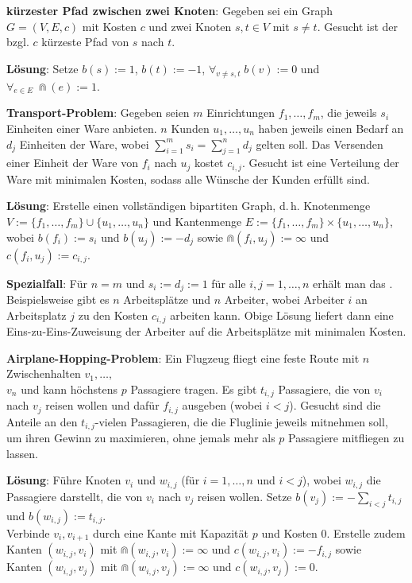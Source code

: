 \textbf{kürzester Pfad zwischen zwei Knoten}:
Gegeben sei ein Graph $G = (V, E, c)$ mit Kosten $c$ und
zwei Knoten $s, t \in V$ mit $s \not= t$.
Gesucht ist der bzgl. $c$ kürzeste Pfad von $s$ nach $t$.

\textbf{Lösung}:
Setze $b(s) := 1$, $b(t) := -1$, $\forall_{v \not= s, t}\; b(v) := 0$ und
$\forall_{e \in E}\; \Cap(e) := 1$.

\linie

\textbf{Transport-Problem}:
Gegeben seien $m$ Einrichtungen $f_1, \dotsc, f_m$, die jeweils $s_i$ Einheiten einer Ware
anbieten.
$n$ Kunden $u_1, \dotsc, u_n$ haben jeweils einen Bedarf an $d_j$ Einheiten der Ware,
wobei $\sum_{i=1}^m s_i = \sum_{j=1}^n d_j$ gelten soll.
Das Versenden einer Einheit der Ware von $f_i$ nach $u_j$ kostet $c_{i,j}$.
Gesucht ist eine Verteilung der Ware mit minimalen Kosten, sodass alle Wünsche der Kunden
erfüllt sind.

\textbf{Lösung}:
Erstelle einen vollständigen bipartiten Graph, d.\,h. Knotenmenge\\
$V := \{f_1, \dotsc, f_m\} \cup \{u_1, \dotsc, u_n\}$
und Kantenmenge $E := \{f_1, \dotsc, f_m\} \times \{u_1, \dotsc, u_n\}$,\\
wobei $b(f_i) := s_i$ und $b(u_j) := -d_j$ sowie
$\Cap(f_i, u_j) := \infty$ und $c(f_i, u_j) := c_{i,j}$.

\textbf{Spezialfall}:
Für $n = m$ und $s_i := d_j := 1$ für alle $i, j = 1, \dotsc, n$ erhält man das
.
Beispielsweise gibt es $n$ Arbeitsplätze und $n$ Arbeiter,
wobei Arbeiter $i$ an Arbeitsplatz $j$ zu den Kosten $c_{i,j}$ arbeiten kann.
Obige Lösung liefert dann eine Eins-zu-Eins-Zuweisung der Arbeiter auf die Arbeitsplätze
mit minimalen Kosten.

\linie

\textbf{Airplane-Hopping-Problem}:
Ein Flugzeug fliegt eine feste Route mit $n$ Zwischenhalten $v_1, \dotsc,$\\
$v_n$ und kann höchstens $p$ Passagiere tragen.
Es gibt $t_{i,j}$ Passagiere, die von $v_i$ nach $v_j$ reisen wollen
und dafür $f_{i,j}$ ausgeben (wobei $i < j$).
Gesucht sind die Anteile an den $t_{i,j}$-vielen Passagieren, die die Fluglinie jeweils mitnehmen
soll, um ihren Gewinn zu maximieren, ohne jemals mehr als $p$ Passagiere mitfliegen zu lassen.

\textbf{Lösung}:
Führe Knoten $v_i$ und $w_{i,j}$ (für $i = 1, \dotsc, n$ und $i < j$),
wobei $w_{i,j}$ die Passagiere darstellt, die von $v_i$ nach $v_j$ reisen wollen.
Setze $b(v_j) :=-\sum_{i<j} t_{i,j}$ und $b(w_{i,j}) := t_{i,j}$.\\
Verbinde $v_i, v_{i+1}$ durch eine Kante mit Kapazität $p$ und Kosten $0$.
Erstelle zudem\\
Kanten $(w_{i,j}, v_i)$ mit $\Cap(w_{i,j}, v_i) := \infty$ und
$c(w_{i,j}, v_i) := -f_{i,j}$ sowie\\
Kanten $(w_{i,j}, v_j)$ mit $\Cap(w_{i,j}, v_j) := \infty$ und $c(w_{i,j}, v_j) := 0$.

\pagebreak
